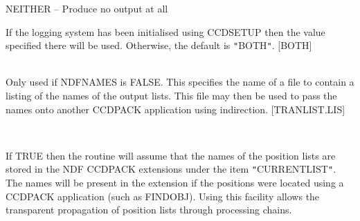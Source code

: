\documentclass[twoside,11pt]{article}
\newcommand{\htmlref}[2]{#1}
\renewcommand{\_}{\texttt{\symbol{95}}}
\newcommand{\qt}[1]{{\tt "}#1{\tt "}}
\newcommand{\xroutine}[1]{\htmlref{{\sc #1}}{#1}}
\newcommand{\sstsubsection}[1]{ \item[{#1}] \mbox{} \\}
\newcommand{\sstitem}{\item}
\newcommand{\sstsubsection}[1]{\item[{#1}]}
\newcommand{\sstitem}{\item}
\begin{document}
{{{{            \sstitem
               NEITHER   -- Produce no output at all

         }
         If the logging system has been initialised using \xroutine{CCDSETUP}
         then the value specified there will be used. Otherwise, the
         default is \qt{BOTH}.
         [BOTH]
      }
      \sstsubsection{
         NAMELIST = \_FILENAME
      }{
         Only used if NDFNAMES is FALSE. This specifies the name of a
         file to contain a listing of the names of the output lists.
         This file may then be used to pass the names onto another
         CCDPACK application using indirection.
         [TRANLIST.LIS]
      }
      \sstsubsection{
         NDFNAMES = \_LOGICAL (Read)
      }{
         If TRUE then the routine will assume that the names of the
         position lists are stored in the NDF CCDPACK extensions under
         the item \qt{CURRENT\_LIST}. The names will be present in the
         extension if the positions were located using a CCDPACK
         application (such as \xroutine{FINDOBJ}). Using this facility allows the
         transparent propagation of position lists through processing
         chains.

}}}
\end{document}
